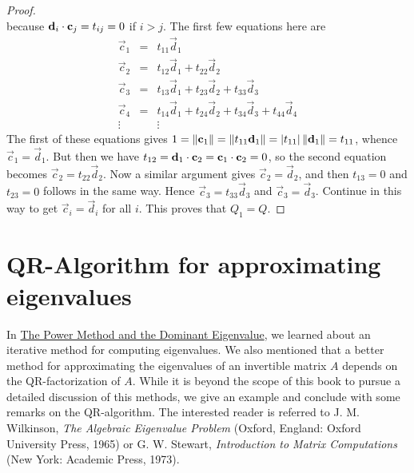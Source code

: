 \documentclass{ximera}
\begin{document}
\begin{proof}
\begin{equation*}
\end{equation*}
because $\mathbf{d}_{i} \cdot \mathbf{c}_{j} = t_{ij} = 0$ if $i > j$. The first few equations here are
\begin{equation*}
\begin{array}{ccl}
\vec{c}_{1} &=& t_{11}\vec{d}_{1} \\
\vec{c}_{2} &=& t_{12}\vec{d}_{1} + t_{22}\vec{d}_{2} \\
\vec{c}_{3} &=& t_{13}\vec{d}_{1} + t_{23}\vec{d}_{2} + t_{33}\vec{d}_{3} \\
\vec{c}_{4} &=& t_{14}\vec{d}_{1} + t_{24}\vec{d}_{2} + t_{34}\vec{d}_{3} + t_{44}\vec{d}_{4} \\
\vdots && \vdots
\end{array}
\end{equation*}
The first of these equations gives $1 = \left\lVert \mathbf{c}_{1} \right\rVert = \left\lVert t_{11}\mathbf{d}_{1} \right\rVert = | t_{11} | \left\lVert \mathbf{d}_{1} \right\rVert = t_{11}$, whence $\vec{c}_{1} = \vec{d}_{1}$. But then we have $t_{12} = \mathbf{d}_{1} \cdot \mathbf{c}_{2} = \mathbf{c}_{1} \cdot \mathbf{c}_{2} = 0$, so the second equation becomes $\vec{c}_{2} = t_{22}\vec{d}_{2}$. Now a similar argument gives $\vec{c}_{2} = \vec{d}_{2}$, and then $t_{13} = 0$ and $t_{23} = 0$ follows in the same way. Hence $\vec{c}_{3} = t_{33}\vec{d}_{3}$ and $\vec{c}_{3} = \vec{d}_{3}$. Continue in this way to get $\vec{c}_{i} = \vec{d}_{i}$ for all $i$. This proves that $Q_{1} = Q$.
\end{proof}

\section*{QR-Algorithm for approximating eigenvalues}\label{sec:QRalgorithm}

In \href{}{The Power Method and the Dominant Eigenvalue}, we learned about an iterative method for computing eigenvalues.  We also mentioned that a better method for approximating the eigenvalues of an invertible matrix $A$ depends on the QR-factorization of $A$.  While it is beyond the scope of this book to pursue a detailed discussion of this methods, we give an example and conclude with some remarks on the QR-algorithm. The interested reader is referred to
 J. M. Wilkinson, \textit{The Algebraic Eigenvalue Problem} (Oxford, England: Oxford University Press, 1965) or G. W. Stewart, \textit{Introduction to Matrix Computations} (New York: Academic Press, 1973).
\end{document}
